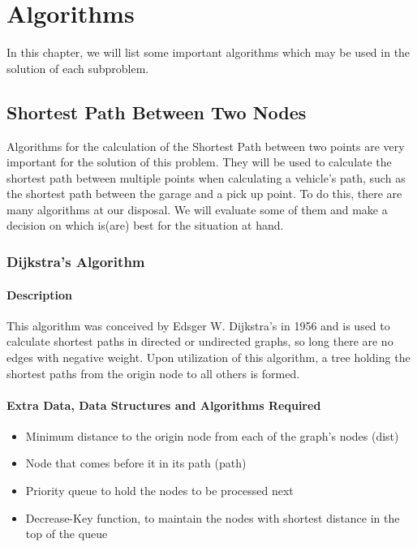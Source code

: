 \chapter{Algorithms}
In this chapter, we will list some important algorithms which may be used in the solution of each subproblem.

\section{Shortest Path Between Two Nodes}

Algorithms for the calculation of the Shortest Path between two points are very important for the solution of this problem. They will be used to calculate the shortest path between multiple points when calculating a vehicle's path, such as the shortest path between the garage and a pick up point. To do this, there are many algorithms at our disposal. We will evaluate some of them and make a decision on which is(are) best for the situation at hand.


\subsection{Dijkstra's Algorithm}

\subsubsection{Description}
This algorithm was conceived by Edsger W. Dijkstra's in 1956 and is used to calculate shortest paths in directed or undirected graphs, so long there are no edges with negative weight. Upon utilization of this algorithm, a tree holding the shortest paths from the origin node to all others is formed. 

\subsubsection{Extra Data, Data Structures and Algorithms Required}
\begin{itemize}
    \item Minimum distance to the origin node from each of the graph's nodes (dist)
    \item Node that comes before it in its path (path)
    \item Priority queue to hold the nodes to be processed next
    \item Decrease-Key function, to maintain the nodes with shortest distance in the top of the queue
\end{itemize}

